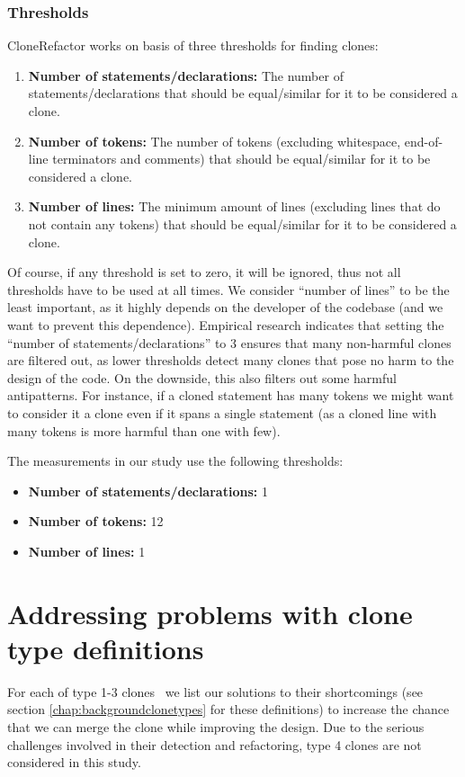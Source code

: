 \documentclass[a4paper]{article}
\begin{document}
\subsubsection{Thresholds}\label{chap:thresholds}
CloneRefactor works on basis of three thresholds for finding clones:
\begin{enumerate}
  \item \textbf{Number of statements/declarations:} The number of statements/declarations that should be equal/similar for it to be considered a clone.
  \item \textbf{Number of tokens:} The number of tokens (excluding whitespace, end-of-line terminators and comments) that should be equal/similar for it to be considered a clone.
  \item \textbf{Number of lines:} The minimum amount of lines (excluding lines that do not contain any tokens) that should be equal/similar for it to be considered a clone.
\end{enumerate}
Of course, if any threshold is set to zero, it will be ignored, thus not all thresholds have to be used at all times. We consider ``number of lines'' to be the least important, as it highly depends on the developer of the codebase (and we want to prevent this dependence). Empirical research indicates that setting the ``number of statements/declarations'' to 3 ensures that many non-harmful clones are filtered out, as lower thresholds detect many clones that pose no harm to the design of the code. On the downside, this also filters out some harmful antipatterns. For instance, if a cloned statement has many tokens we might want to consider it a clone even if it spans a single statement (as a cloned line with many tokens is more harmful than one with few).

The measurements in our study use the following thresholds:
\begin{itemize}
  \item \textbf{Number of statements/declarations:} 1
  \item \textbf{Number of tokens:} 12
  \item \textbf{Number of lines:} 1
\end{itemize}

\section{Addressing problems with clone type definitions}\label{chap:clonetypes}
For each of type 1-3 clones~\cite{roy2007survey} we list our solutions to their shortcomings (see section \ref{chap:backgroundclonetypes} for these definitions) to increase the chance that we can merge the clone while improving the design. Due to the serious challenges involved in their detection and refactoring, type 4 clones are not considered in this study.
\end{document}
